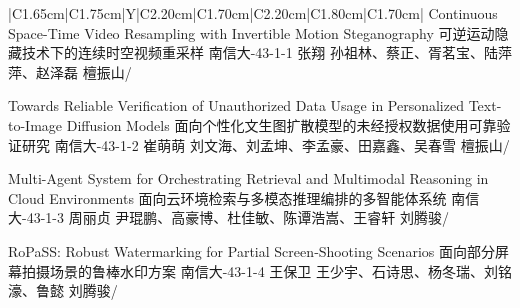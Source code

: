 \Needspace{7.5cm}
\begin{tabularx}{\textwidth}{|C{1.65cm}|C{1.75cm}|Y|C{2.20cm}|C{1.70cm}|C{2.20cm}|C{1.80cm}|C{1.70cm}|}
\HeaderRow
{}
{Continuous Space-Time Video Resampling with Invertible Motion Steganography\newline 
可逆运动隐藏技术下的连续时空视频重采样}
{南信大-43-1-1}
{张翔}
{孙祖林、蔡正、胥茗宝、陆萍萍、赵泽磊}
{檀振山}{/}

{Towards Reliable Verification of Unauthorized Data Usage in Personalized Text-to-Image Diffusion Models \newline 
面向个性化文生图扩散模型的未经授权数据使用可靠验证研究}
{南信大-43-1-2}
{崔萌萌}
{刘文海、刘孟坤、李孟豪、田嘉鑫、吴春雪}
{檀振山}{/}


{Multi-Agent System for Orchestrating Retrieval and Multimodal Reasoning in Cloud Environments \newline 
面向云环境检索与多模态推理编排的多智能体系统}
{南信大-43-1-3}
{周丽贞}
{尹琨鹏、高豪博、杜佳敏、陈谭浩嵩、王睿轩}
{刘腾骏}{/}

{RoPaSS: Robust Watermarking for Partial Screen‑Shooting Scenarios\newline 
面向部分屏幕拍摄场景的鲁棒水印方案}
{南信大-43-1-4}
{王保卫}
{王少宇、石诗思、杨冬瑞、刘铭濠、鲁懿}
{刘腾骏}{/}
\end{tabularx}
\BlockGap



